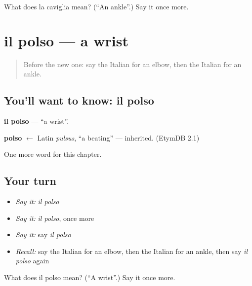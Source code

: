 \begin{tcolorbox}[breakable,colback=teal!4,colframe=teal!35!black,title={Before you move on}]
What does la caviglia mean? (\textquotedblleft{}An ankle\textquotedblright{}.) Say it once more.
\end{tcolorbox}
\section[il polso]{il polso — a wrist}

\label{lesson:IT-C122-polso}



\begin{quote}
Before the new one: say the Italian for an elbow, then the Italian for an ankle.
\end{quote}

\subsection*{You'll want to know: il polso}
\textbf{il polso} — \textquotedblleft{}a wrist\textquotedblright{}.

\begin{cousinweb}
\textbf{polso} $\leftarrow$ Latin \emph{pulsus}, \textquotedblleft{}a beating\textquotedblright{} — inherited. (EtymDB 2.1)
\end{cousinweb}

\begin{grammarlens}[title={What you've built}]
One more word for this chapter.
\end{grammarlens}

\subsection*{Your turn}
\begin{itemize}
\raggedright
  \item \emph{Say it:} \emph{il polso}
  \item \emph{Say it:} \emph{il polso}, once more
  \item \emph{Say it:} say \emph{il polso}
  \item \emph{Recall:} say the Italian for an elbow, then the Italian for an ankle, then say \emph{il polso} again
\end{itemize}

\begin{tcolorbox}[breakable,colback=teal!4,colframe=teal!35!black,title={Before you move on}]
What does il polso mean? (\textquotedblleft{}A wrist\textquotedblright{}.) Say it once more.
\end{tcolorbox}
